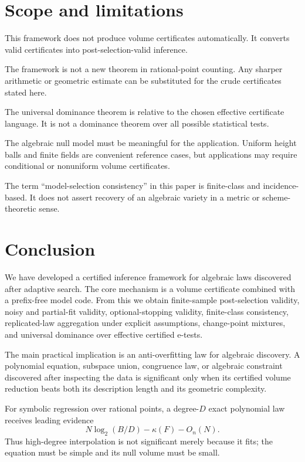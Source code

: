 \documentclass[11pt]{article}
\begin{document}
\section{Scope and limitations}

This framework does not produce volume certificates automatically. It converts valid certificates into post-selection-valid inference.

The framework is not a new theorem in rational-point counting. Any sharper arithmetic or geometric estimate can be substituted for the crude certificates stated here.

The universal dominance theorem is relative to the chosen effective certificate language. It is not a dominance theorem over all possible statistical tests.

The algebraic null model must be meaningful for the application. Uniform height balls and finite fields are convenient reference cases, but applications may require conditional or nonuniform volume certificates.

The term ``model-selection consistency'' in this paper is finite-class and incidence-based. It does not assert recovery of an algebraic variety in a metric or scheme-theoretic sense.

\section{Conclusion}

We have developed a certified inference framework for algebraic laws discovered after adaptive search. The core mechanism is a volume certificate combined with a prefix-free model code. From this we obtain finite-sample post-selection validity, noisy and partial-fit validity, optional-stopping validity, finite-class consistency, replicated-law aggregation under explicit assumptions, change-point mixtures, and universal dominance over effective certified e-tests.

The main practical implication is an anti-overfitting law for algebraic discovery. A polynomial equation, subspace union, congruence law, or algebraic constraint discovered after inspecting the data is significant only when its certified volume reduction beats both its description length and its geometric complexity.

For symbolic regression over rational points, a degree-$D$ exact polynomial law receives leading evidence
\[
N\log_2(B/D)-\kappa(F)-O_n(N).
\]
Thus high-degree interpolation is not significant merely because it fits; the equation must be simple and its null volume must be small.
\end{document}
